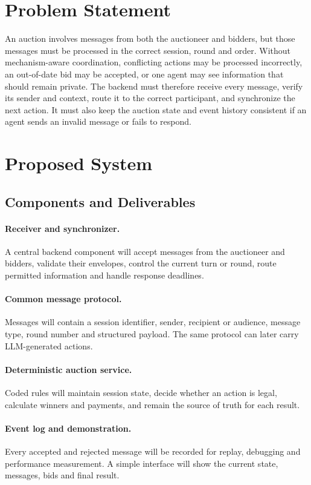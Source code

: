 \documentclass[11pt]{article}
\begin{document}
\section{Problem Statement}
An auction involves messages from both the auctioneer and bidders, but those messages must be processed in the correct session, round and order. Without mechanism-aware coordination, conflicting actions may be processed incorrectly, an out-of-date bid may be accepted, or one agent may see information that should remain private. The backend must therefore receive every message, verify its sender and context, route it to the correct participant, and synchronize the next action. It must also keep the auction state and event history consistent if an agent sends an invalid message or fails to respond.

\section{Proposed System}
\subsection{Components and Deliverables}
\paragraph{Receiver and synchronizer.} A central backend component will accept messages from the auctioneer and bidders, validate their envelopes, control the current turn or round, route permitted information and handle response deadlines.
\paragraph{Common message protocol.} Messages will contain a session identifier, sender, recipient or audience, message type, round number and structured payload. The same protocol can later carry LLM-generated actions.
\paragraph{Deterministic auction service.} Coded rules will maintain session state, decide whether an action is legal, calculate winners and payments, and remain the source of truth for each result.
\paragraph{Event log and demonstration.} Every accepted and rejected message will be recorded for replay, debugging and performance measurement. A simple interface will show the current state, messages, bids and final result.
\end{document}
